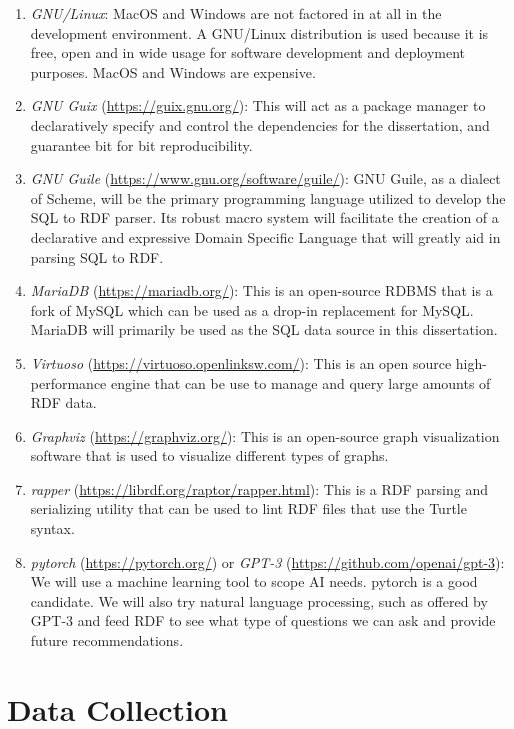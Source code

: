 \begin{enumerate}
\item \textit{GNU/Linux}:  MacOS and Windows are not factored in at all in the development environment.  A GNU/Linux distribution is used because it is free, open and in wide usage for software development and deployment purposes.  MacOS and Windows are expensive.
\item \textit{GNU Guix} (\url{https://guix.gnu.org/}): This will act as a package manager to declaratively specify and control the dependencies for the dissertation, and guarantee bit for bit reproducibility.
\item \textit{GNU Guile} (\url{https://www.gnu.org/software/guile/}): GNU Guile, as a dialect of Scheme, will be the primary programming language utilized to develop the SQL to RDF parser. Its robust macro system will facilitate the creation of a declarative and expressive Domain Specific Language that will greatly aid in parsing SQL to RDF.
\item \textit{MariaDB} (\url{https://mariadb.org/}): This is an open-source RDBMS that is a fork of MySQL which can be used as a drop-in replacement for MySQL.  MariaDB will primarily be used as the SQL data source in this dissertation.
\item \textit{Virtuoso} (\url{https://virtuoso.openlinksw.com/}): This is an open source high-performance engine that can be use to manage and query large amounts of RDF data.
\item \textit{Graphviz} (\url{https://graphviz.org/}): This is an open-source graph visualization software that is used to visualize different types of graphs.
\item \textit{rapper} (\url{https://librdf.org/raptor/rapper.html}): This is a RDF parsing and serializing utility that can be used to lint RDF files that use the Turtle syntax.
\item \textit{pytorch} (\url{https://pytorch.org/}) or \textit{GPT-3} (\url{https://github.com/openai/gpt-3}): We will use a machine learning tool to scope AI needs. pytorch is a good candidate.  We will also try natural language processing, such as offered by GPT-3 and feed RDF to see what type of questions we can ask and provide future recommendations.
\end{enumerate}

\section{Data Collection}

